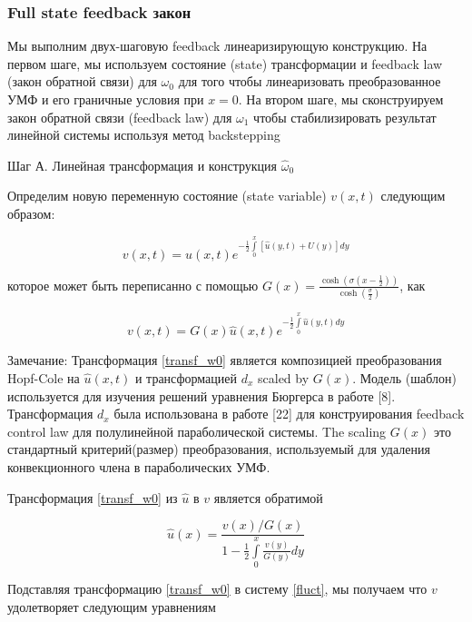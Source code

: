 \subsubsection{Full state feedback закон}

Мы выполним двух-шаговую feedback линеаризирующую конструкцию. На первом шаге, мы используем состояние (state) трансформации и feedback law (закон обратной связи) для $\omega_0$ для того чтобы линеаризовать преобразованное УМФ и его граничные условия при $x = 0$. На втором шаге, мы сконструируем закон обратной связи (feedback law) для $\omega_1$ чтобы стабилизировать результат линейной системы используя метод backstepping

Шаг А. Линейная трансформация и конструкция $\hat{\omega}_0$

Определим новую переменную состояние (state variable) $v(x, t)$ следующим образом:

\begin{equation}
  v(x, t) = \hat{u}(x, t)e^{-\frac{1}{2}\int\limits_0^x{[\hat{u}(y, t) + U(y)] dy}}
\end{equation}

которое может быть переписанно с помощью $G(x) = \frac{\cosh(\sigma(x - \frac{1}{2}))}{\cosh(\frac{\sigma}{2})}$, как

\begin{equation}\label{transf_w0}
  v(x, t) = G(x)\hat{u}(x, t)e^{-\frac{1}{2}\int\limits_0^x{\hat{u}(y, t) dy}}
\end{equation}


Замечание: Трансформация \eqref{transf_w0} является композицией преобразования Hopf-Cole на $\hat{u}(x, t)$ и трансформацией $d_x$ scaled by $G(x)$. Модель (шаблон) используется для изучения решений уравнения Бюргерса в работе [8]. Трансформация $d_x$ была использована в работе [22] для конструирования feedback control law для полулинейной параболической системы. The scaling $G(x)$
это стандартный критерий(размер) преобразования, используемый для удаления конвекционного члена в параболических УМФ.

Трансформация \eqref{transf_w0} из $\hat{u}$ в $v$ является обратимой

\begin{equation}
  \hat{u}(x) = \frac{v(x)/G(x)}{1 - \frac{1}{2}\int\limits_0^x{\frac{v(y)}{G(y)}dy}}
\end{equation}

Подставляя трансформацию \eqref{transf_w0} в систему \eqref{fluct}, мы получаем что $v$ удолетворяет следующим уравнениям

